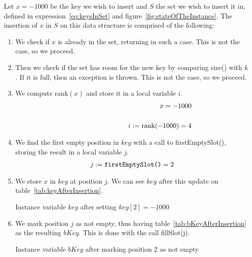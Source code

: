 Let $x = -1000$ be the key we wish to insert and $S$ the set we wish to insert it in, defined in expression~\ref{eq:keysInSet} and figure~\ref{fig:stateOfTheInstance}. The insertion of $x$ in $S$ on this data structure is comprised of the following:
\begin{enumerate}
    \item
    We check if $x$ is already in the set, returning in such a case.
    This is not the case, so we proceed.
    
    \item
    Then we check if the set has room for the new key by comparing {\ttfamily size()} with $k$. If it is full, then an exception is thrown.
    This is not the case, so we proceed.
    
    \item
    We compute $\text{rank}(x)$ and store it in a local variable $i$.
    \begin{align*}
        x = -1000 \\
        \cline{1-2}
        i := \text{rank}(-1000) = 4
    \end{align*}
    
    \item
    We find the first empty position in $key$ with a call to {\ttfamily firstEmptySlot()}, storing the result in a local variable $j$.
    \begin{align*}
        j := \text{{\ttfamily firstEmptySlot()}} = 2
    \end{align*}
    
    \item
    We store $x$ in $key$ at position $j$. We can see $key$ after this update on table~\ref{tab:keyAfterInsertion}.
    \begin{table}[H]
    \centering
    
    \caption[Example $key$ after the insertion of a new key]{Instance variable $key$ after setting $key[2] = -1000$}
    \label{tab:keyAfterInsertion}
    \end{table}
    
    \item
    We mark position $j$ as not empty, thus having table~\ref{tab:bKeyAfterInsertion} as the resulting $bKey$. This is done with the call {\ttfamily fillSlot(j)}.
    \begin{table}[H]
    \centering
    
    \caption[Example $bKey$ after the insertion of a new key]{Instance variable $bKey$ after marking position 2 as not empty}
    \label{tab:bKeyAfterInsertion}
    \end{table}
    

\end{enumerate}
